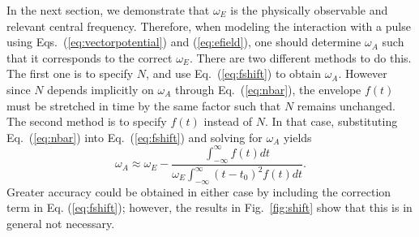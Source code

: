 In the next section, we demonstrate that $\omega_E$ is the physically observable and relevant central frequency. Therefore, when modeling the interaction with a pulse using Eqs.~(\ref{eq:vectorpotential}) and (\ref{eq:efield}), one should determine $\omega_A$  such that it corresponds to the correct $\omega_E$. There are two different methods to do this. The first one is to specify $N$, and use Eq.~(\ref{eq:fshift}) to obtain $\omega_A$. However since $N$ depends implicitly on $\omega_A$ through Eq.~(\ref{eq:nbar}), the envelope $f(t)$ must be stretched in time by the same factor such that $N$ remains unchanged. The second method is to specify $f(t)$ instead of $N$. In that case, substituting Eq.~(\ref{eq:nbar}) into Eq.~(\ref{eq:fshift}) and solving for $\omega_A$ yields
%
\begin{equation}
\label{eq:alternative}
\omega_A \approx \omega_E - \frac{\int_{-\infty}^{\infty} f(t) dt}{\omega_E\int_{-\infty}^{\infty} (t-t_0)^2 f(t) dt}.
\end{equation}
%
Greater accuracy could be obtained in either case by including the correction term in Eq. (\ref{eq:fshift}); however, the results in Fig.~\ref{fig:shift} show that this is in general not necessary. 

